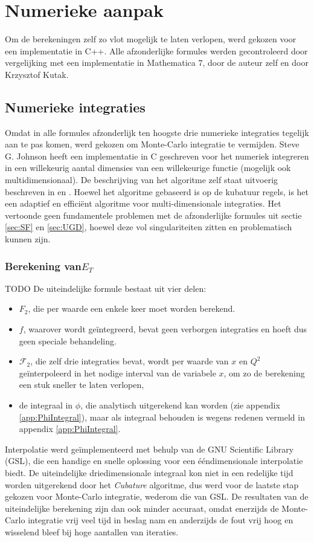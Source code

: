\documentclass[a4paper,11pt]{article}
\numberwithin{equation}{section} %
\begin{document}
\section{Numerieke aanpak}
Om de berekeningen zelf zo vlot mogelijk te laten verlopen, werd gekozen voor een implementatie in C++.
Alle afzonderlijke formules werden gecontroleerd door vergelijking met een implementatie in Mathematica 7, door de auteur zelf en door Krzysztof Kutak.

  \subsection{Numerieke integraties}
Omdat in alle formules afzonderlijk ten hoogste drie numerieke integraties tegelijk aan te pas komen, werd gekozen om Monte-Carlo integratie te vermijden.
Steve G. Johnson heeft een implementatie in C geschreven voor het numeriek integreren in een willekeurig aantal dimensies van een willekeurige functie (mogelijk ook multidimensionaal).
De beschrijving van het algoritme zelf staat uitvoerig beschreven in \cite{Genz} en \cite{Berntsen}.
Hoewel het algoritme gebaseerd is op de kubatuur regels, is het een adaptief en efficiënt algoritme voor multi-dimensionale integraties.
Het vertoonde geen fundamentele problemen met de afzonderlijke formules uit sectie \ref{sec:SF} en \ref{sec:UGD}, hoewel deze vol singulariteiten zitten en problematisch kunnen zijn.

  \subsubsection{Berekening van$E_T$}
TODO
De uiteindelijke formule bestaat uit vier delen:
\begin{itemize}
  \item $F_2$, die per waarde een enkele keer moet worden berekend.
  \item $f$, waarover wordt geïntegreerd, bevat geen verborgen integraties en hoeft dus geen speciale behandeling.
  \item $\mathcal{F}_2$, die zelf drie integraties bevat, wordt per waarde van $x$ en $Q^2$ geïnterpoleerd in het nodige interval van de variabele $x$, om zo de berekening een stuk sneller te laten verlopen,
  \item de integraal in $\phi$, die analytisch uitgerekend kan worden (zie appendix \ref{app:PhiIntegral}), maar als integraal behouden is wegens redenen vermeld in appendix \ref{app:PhiIntegral}.
\end{itemize}
Interpolatie werd geïmplementeerd met behulp van de GNU Scientific Library (GSL), die een handige en snelle oplossing voor een ééndimensionale interpolatie biedt.
De uiteindelijke driedimensionale integraal kon niet in een redelijke tijd worden uitgerekend door het \textit{Cubature} algoritme, dus werd voor de laatste stap gekozen voor Monte-Carlo integratie, wederom die van GSL.
De resultaten van de uiteindelijke berekening zijn dan ook minder accuraat, omdat enerzijds de Monte-Carlo integratie vrij veel tijd in beslag nam en anderzijds de fout vrij hoog en wisselend bleef bij hoge aantallen van iteraties.
\end{document}
